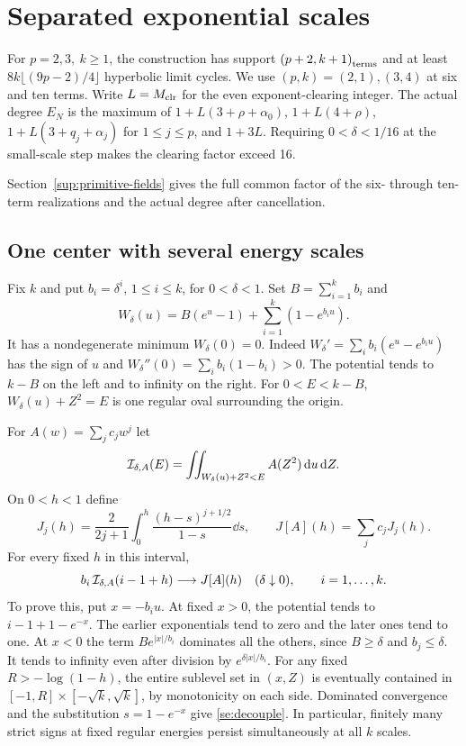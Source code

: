 \section{Separated exponential scales}\label{se:sec:separated}
\begin{theorem}\label{se:main}
For \(p=2,3,\ k\ge1\), the construction has support \(\left(p+2,k+1\right)_{\mathrm{terms}}\) and at least \(8k\lfloor(9p-2)/4\rfloor\) hyperbolic limit cycles. We use \((p,k)=(2,1),(3,4)\) at six and ten terms. Write \(L=M_{\mathrm{clr}}\) for the even exponent-clearing integer. The actual degree \(E_N\) is the maximum of \(1+L(3+\rho+\alpha_0)\), \(1+L(4+\rho)\), \(1+L(3+q_j+\alpha_j)\) for \(1\le j\le p\), and \(1+3L\). Requiring \(0<\delta<1/16\) at the small-scale step makes the clearing factor exceed 16.
\end{theorem}
Section~\ref{sup:primitive-fields} gives the full common factor of the six- through ten-term realizations and the actual degree after cancellation.

\subsection{One center with several energy scales}
Fix \(k\) and put \(b_i=\delta^i\), \(1\le i\le k\), for \(0<\delta<1\).
Set \(B=\sum_{i=1}^k b_i\) and
\begin{equation}
 W_\delta(u)=B(e^u-1)+\sum_{i=1}^k(1-e^{b_i u}).                    \label{se:W}
\end{equation}
It has a nondegenerate minimum \(W_\delta(0)=0\).
Indeed \(W_\delta'=\sum_i b_i(e^u-e^{b_i u})\) has the sign of \(u\)
and \(W_\delta''(0)=\sum_i b_i(1-b_i)>0\). The potential tends to
\(k-B\) on the left and to infinity on the right. For
\(0<E<k-B\), \(W_\delta(u)+Z^2=E\) is one regular oval surrounding the
origin.

For \(A(w)=\sum_j c_jw^j\) let
\[
 {\cal I}_{\delta,A}(E)=\iint_{W_\delta(u)+Z^2<E} A(Z^2)\,\mathrm{d} u\,\mathrm{d} Z .
\]
On \(0<h<1\) define
\begin{equation}
 J_j(h)=\frac{2}{2j+1}\int_0^h\frac{(h-s)^{j+1/2}}{1-s}\dd s,
 \qquad J[A](h)=\sum_j c_jJ_j(h).                                   \label{se:mom}
\end{equation}
For every fixed \(h\) in this interval,
\begin{equation}
 b_i\,{\cal I}_{\delta,A}(i-1+h)\longrightarrow J[A](h)
 \quad(\delta\downarrow0),\qquad i=1,\ldots,k.                       \label{se:decouple}
\end{equation}
To prove this, put \(x=-b_i u\). At fixed \(x>0\), the potential tends
to \(i-1+1-e^{-x}\). The earlier exponentials tend to zero and the
later ones tend to one. At \(x<0\) the term \(B e^{|x|/b_i}\) dominates
all the others, since \(B\ge\delta\) and \(b_j\le\delta\). It tends to
infinity even after division by \(e^{\delta|x|/b_i}\).
For any fixed \(R>-\log(1-h)\), the entire sublevel set in \((x,Z)\)
is eventually contained in \([-1,R]\times[-\sqrt{k},\sqrt{k}]\), by
monotonicity on each side. Dominated convergence and the substitution
\(s=1-e^{-x}\) give \eqref{se:decouple}. In particular, finitely many strict
signs at fixed regular energies persist simultaneously at all \(k\) scales.

